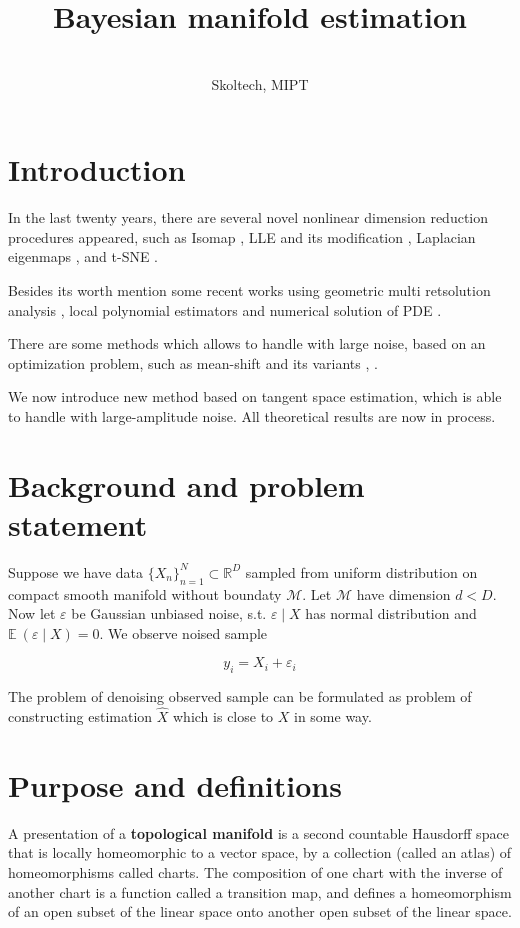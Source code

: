\documentclass[tablecaption=bottom,wcp]{jmlr} %
\title[Bayesian manifold estimation]{Bayesian manifold estimation}
\author{\Name{Busovikov Vladimir}\\
  \addr Skoltech, MIPT}
\begin{document}
\maketitle


\section{Introduction}

In the last twenty years, there are  several novel nonlinear dimension reduction procedures appeared, such
as Isomap  \cite{isomap} , LLE \cite{lle} and its modification \cite{lle2}, Laplacian eigenmaps \cite{laplas}, and t-SNE \cite{tsne}.

Besides its worth mention some recent works using  geometric multi retsolution analysis \cite{geom}, local polynomial estimators \cite{polynom} and numerical solution of PDE \cite{pde}.


There are some methods which allows to handle with large noise, based on an optimization problem, such as mean-shift \cite{meanshift} and its variants \cite{meanshift2}, \cite{ldmm}.

We now introduce new method based on tangent space estimation, which is able to handle with large-amplitude noise. All theoretical results are now in process.


\section{Background and problem statement}

Suppose we have data $\{X_n\}_{n=1}^N \subset \mathbb{R}^D$ sampled from uniform distribution on compact smooth manifold without boundaty $\mathcal{M}$. Let $\mathcal{M}$ have dimension $d < D$. Now let $\varepsilon$ be Gaussian unbiased noise, s.t. $\varepsilon \mid X$ has normal distribution and $\mathbb{E} \ (\varepsilon \mid X) = 0$. We observe noised sample

$$ y_i = X_i + \varepsilon_i$$

The problem of denoising observed sample can be formulated as problem of constructing estimation $\hat X$ which is close to $X$ in some way.

\section{Purpose and definitions}

A presentation of a \textbf{topological manifold} is a second countable Hausdorff space that is locally homeomorphic to a vector space, by a collection (called an atlas) of homeomorphisms called charts. The composition of one chart with the inverse of another chart is a function called a transition map, and defines a homeomorphism of an open subset of the linear space onto another open subset of the linear space.
\end{document}
